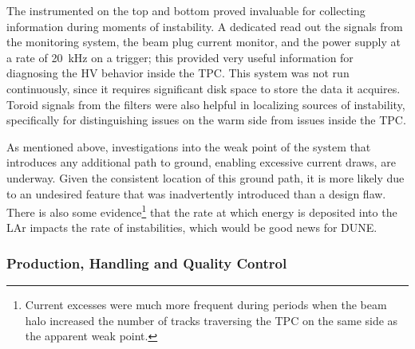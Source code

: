 
The instrumented  on the top and bottom  proved invaluable for collecting information during moments of instability.
A dedicated  read out the signals from the  monitoring system, the beam plug current monitor, and the power supply at a rate of \SI{20}{kHz} on a trigger; this provided very useful information for diagnosing the HV behavior inside the TPC.
This system was not run continuously, since it requires significant disk space to store the data it acquires.
Toroid signals from the  filters were also helpful in localizing sources of instability, specifically for distinguishing issues on the warm side from issues inside the TPC.

As mentioned above, investigations into the weak point of the system that introduces any additional path to ground, enabling excessive current draws, are underway.
Given the consistent location of this ground path, it is more likely due to an undesired feature that was inadvertently introduced than a design flaw.
There is also some evidence\footnote{Current excesses were much more frequent during periods when the beam halo increased the number of tracks traversing the TPC on the same side as the apparent weak point.} that the rate at which energy is deposited into the LAr impacts the rate of instabilities, which would be good news for DUNE.

\subsubsection{Production, Handling and Quality Control}
\label{sec:fdsp-hv-protodune-lessons-assy}

